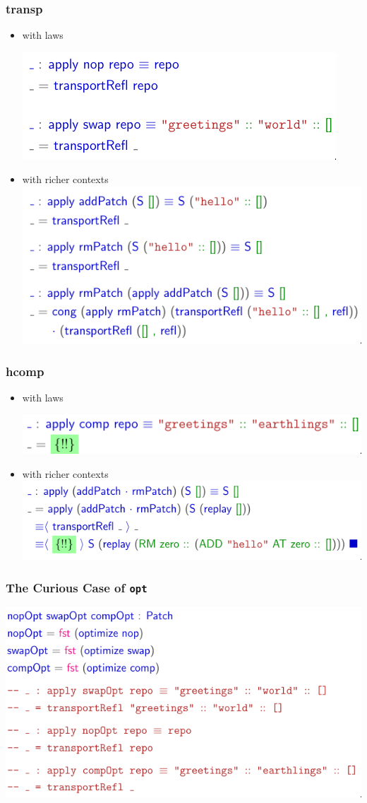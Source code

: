 \documentclass{beamer}
\begin{document}
\begin{frame}
  \frametitle{transp}
  \begin{itemize}
  \item with laws
    
    \includegraphics[width=.7\textwidth]{figures/laws-transportRefl}
  \item with richer contexts
    \includegraphics[width=.7\textwidth]{figures/richer-transportRefl}
  \end{itemize}
\end{frame}

\begin{frame}
  \frametitle{hcomp}
  \begin{itemize}
  \item with laws
    
    \includegraphics[width=.8\textwidth]{figures/laws-hcomp}
  \item with richer contexts
    \includegraphics[width=.8\textwidth]{figures/richer-hcomp}
  \end{itemize}
\end{frame}

\begin{frame}
  \frametitle{The Curious Case of \texttt{opt}}
  \includegraphics[width=\textwidth]{figures/optimizer}
\end{frame}
\end{document}
